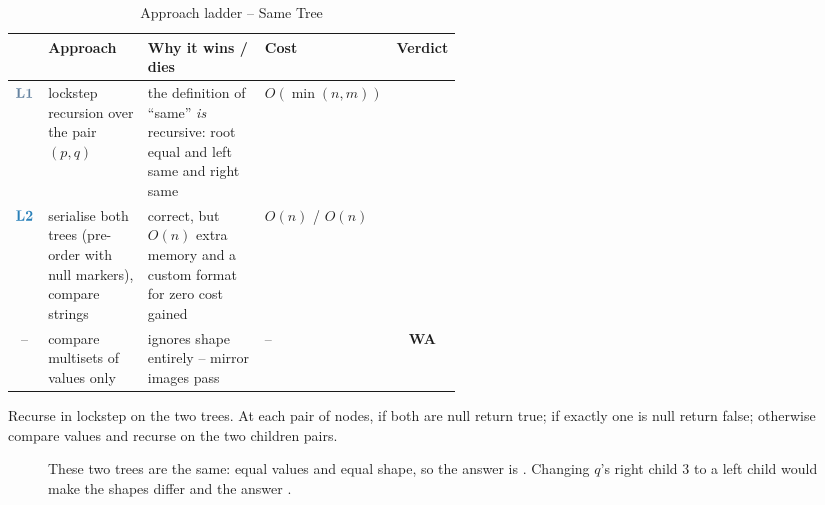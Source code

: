 \begin{table}[H]\centering\small
\caption*{Approach ladder -- Same Tree}
\begin{tabular}{@{}c p{0.235\linewidth} p{0.28\linewidth} l c@{}}
\toprule
& \textbf{Approach} & \textbf{Why it wins / dies} & \textbf{Cost} & \textbf{Verdict}\\
\midrule
$\lv1$ & lockstep recursion over the pair $(p,q)$
  & the definition of ``same'' \emph{is} recursive: root equal and left same and right same
  & $O(\min(n,m))$ & \ac\\
\addlinespace
$\lv2$ & serialise both trees (pre-order with null markers), compare strings
  & correct, but $O(n)$ extra memory and a custom format for zero cost gained
  & $O(n)$ / $O(n)$ & \ac\\
\addlinespace
--   & compare multisets of values only
  & ignores shape entirely -- mirror images pass
  & -- & {\colorbox{warningred!12}{\textcolor{warningred}{\scriptsize\bfseries WA}}}\\
\bottomrule
\end{tabular}
\end{table}

Recurse in lockstep on the two trees. At each pair of nodes, if both are null return
true; if exactly one is null return false; otherwise compare values and recurse on the
two children pairs.
\begin{figure}[H]
\centering
{}
\caption{These two trees are the same: equal values and equal shape, so the answer is
. Changing $q$'s right child $3$ to a left child would make the shapes
differ and the answer .}\label{fig:c01-same-tree}
\end{figure}

